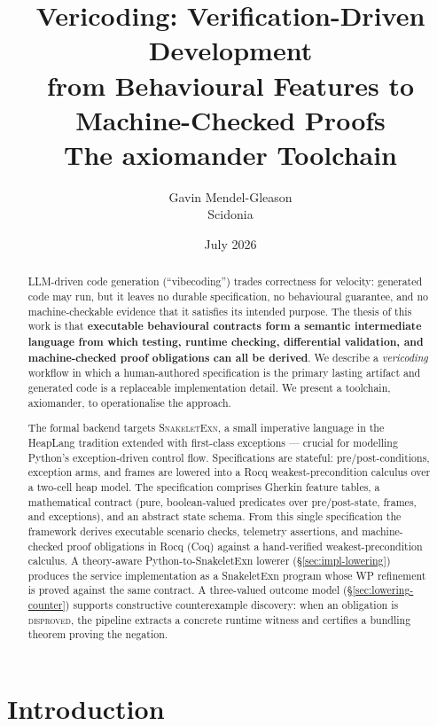 \documentclass[11pt,a4paper]{article}
\title{\textbf{Vericoding: Verification-Driven Development\\
from Behavioural Features to Machine-Checked Proofs}\\[4pt]
\large The \textsf{axiomander} Toolchain}
\author{Gavin Mendel-Gleason\\Scidonia}
\date{July 2026}
\begin{document}
\maketitle

\begin{abstract}
LLM-driven code generation (``vibecoding'') trades correctness for
velocity: generated code may run, but it leaves no durable
specification, no behavioural guarantee, and no machine-checkable
evidence that it satisfies its intended purpose.  The thesis of
this work is that \textbf{executable behavioural contracts form a
semantic intermediate language from which testing, runtime checking,
differential validation, and machine-checked proof obligations can all
be derived}.  We describe a \emph{vericoding} workflow in which a
human-authored specification is the primary lasting artifact and
generated code is a replaceable implementation detail.  We present a
toolchain, \textsf{axiomander}, to operationalise the approach.

The formal backend targets \textsc{SnakeletExn}, a small imperative
language in the HeapLang tradition extended with first-class
exceptions --- crucial for modelling Python's exception-driven control
flow.  Specifications are stateful: pre/post-conditions, exception
arms, and frames are lowered into a Rocq weakest-precondition
calculus over a two-cell heap model.
The specification comprises Gherkin feature tables, a mathematical
contract (pure, boolean-valued predicates over pre/post-state, frames,
and exceptions), and an abstract state schema.  From this single
specification the framework derives executable scenario checks,
telemetry assertions, and machine-checked proof obligations in Rocq
(Coq) against a hand-verified weakest-precondition calculus.  A
theory-aware Python-to-SnakeletExn lowerer
(\S\ref{sec:impl-lowering}) produces the service implementation as a
SnakeletExn program whose WP refinement is proved against the same
contract.  A three-valued outcome model (\S\ref{sec:lowering-counter})
supports constructive counterexample discovery: when an obligation is
\textsc{disproved}, the pipeline extracts a concrete runtime witness
and certifies a bundling theorem proving the negation.
\end{abstract}

\section{Introduction}\label{sec:intro}
\end{document}
